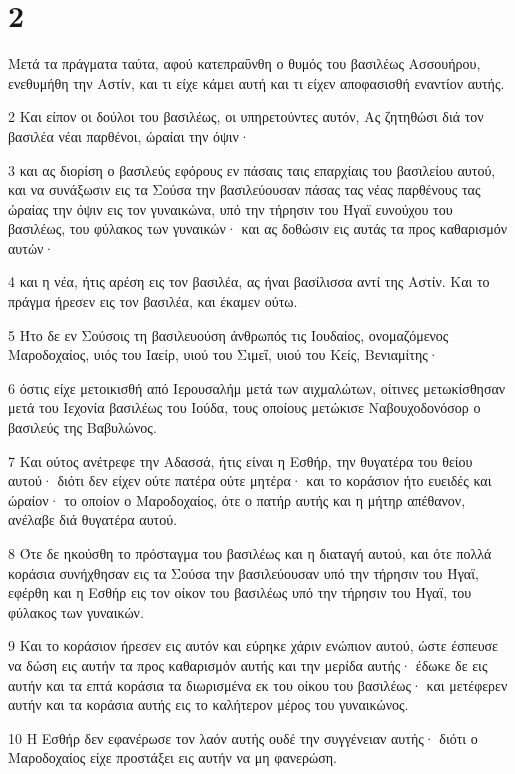 \chapter{2}

\par Μετά τα πράγματα ταύτα, αφού κατεπραΰνθη ο θυμός του βασιλέως Ασσουήρου, ενεθυμήθη την Αστίν, και τι είχε κάμει αυτή και τι είχεν αποφασισθή εναντίον αυτής.
\par 2 Και είπον οι δούλοι του βασιλέως, οι υπηρετούντες αυτόν, Ας ζητηθώσι διά τον βασιλέα νέαι παρθένοι, ώραίαι την όψιν·
\par 3 και ας διορίση ο βασιλεύς εφόρους εν πάσαις ταις επαρχίαις του βασιλείου αυτού, και να συνάξωσιν εις τα Σούσα την βασιλεύουσαν πάσας τας νέας παρθένους τας ώραίας την όψιν εις τον γυναικώνα, υπό την τήρησιν του Ήγαϊ ευνούχου του βασιλέως, του φύλακος των γυναικών· και ας δοθώσιν εις αυτάς τα προς καθαρισμόν αυτών·
\par 4 και η νέα, ήτις αρέση εις τον βασιλέα, ας ήναι βασίλισσα αντί της Αστίν. Και το πράγμα ήρεσεν εις τον βασιλέα, και έκαμεν ούτω.
\par 5 Ήτο δε εν Σούσοις τη βασιλευούση άνθρωπός τις Ιουδαίος, ονομαζόμενος Μαροδοχαίος, υιός του Ιαείρ, υιού του Σιμεΐ, υιού του Κείς, Βενιαμίτης·
\par 6 όστις είχε μετοικισθή από Ιερουσαλήμ μετά των αιχμαλώτων, οίτινες μετωκίσθησαν μετά του Ιεχονία βασιλέως του Ιούδα, τους οποίους μετώκισε Ναβουχοδονόσορ ο βασιλεύς της Βαβυλώνος.
\par 7 Και ούτος ανέτρεφε την Αδασσά, ήτις είναι η Εσθήρ, την θυγατέρα του θείου αυτού· διότι δεν είχεν ούτε πατέρα ούτε μητέρα· και το κοράσιον ήτο ευειδές και ώραίον· το οποίον ο Μαροδοχαίος, ότε ο πατήρ αυτής και η μήτηρ απέθανον, ανέλαβε διά θυγατέρα αυτού.
\par 8 Ότε δε ηκούσθη το πρόσταγμα του βασιλέως και η διαταγή αυτού, και ότε πολλά κοράσια συνήχθησαν εις τα Σούσα την βασιλεύουσαν υπό την τήρησιν του Ήγαϊ, εφέρθη και η Εσθήρ εις τον οίκον του βασιλέως υπό την τήρησιν του Ήγαϊ, του φύλακος των γυναικών.
\par 9 Και το κοράσιον ήρεσεν εις αυτόν και εύρηκε χάριν ενώπιον αυτού, ώστε έσπευσε να δώση εις αυτήν τα προς καθαρισμόν αυτής και την μερίδα αυτής· έδωκε δε εις αυτήν και τα επτά κοράσια τα διωρισμένα εκ του οίκου του βασιλέως· και μετέφερεν αυτήν και τα κοράσια αυτής εις το καλήτερον μέρος του γυναικώνος.
\par 10 Η Εσθήρ δεν εφανέρωσε τον λαόν αυτής ουδέ την συγγένειαν αυτής· διότι ο Μαροδοχαίος είχε προστάξει εις αυτήν να μη φανερώση.
